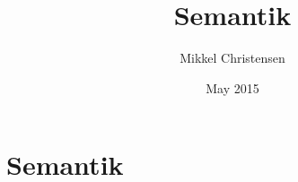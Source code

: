 \documentclass{article}
\title{Semantik}
\author{Mikkel Christensen}
\date{May 2015}
\begin{document}
\maketitle

\section{Semantik}

\end{document}
